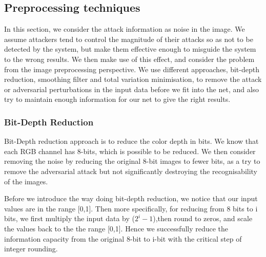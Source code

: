 \subsection{Preprocessing techniques}
In this section, we consider the attack information as noise in the image. We assume attackers tend to control the magnitude of their attacks so as not to be detected by the system, but make them effective enough to misguide the system to the wrong results. We then make use of this effect, and consider the problem from the image preprocessing perspective. We use different approaches, bit-depth reduction, smoothing filter and total variation minimisation, to remove the attack or adversarial perturbations in the input data before we fit into the net, and also try to maintain enough information for our net to give the right results.

\subsubsection{Bit-Depth Reduction} %
Bit-Depth reduction approach is to reduce the color depth in bits. We know that each RGB channel has 8-bits, which is possible to be reduced. We then consider removing the noise by reducing the original 8-bit images to fewer bits, as a try to remove the adversarial attack but not significantly destroying the recognisability of the images. 

Before we introduce the way doing bit-depth reduction, we notice that our input values are in the range [0,1]. Then more specifically, for reducing from 8 bits to i bits, we first multiply the input data by ($2^i - 1$),then round to zeros, and scale the values back to the the range [0,1]. Hence we successfully reduce the information capacity from the original 8-bit to i-bit with the critical step of integer rounding. 




